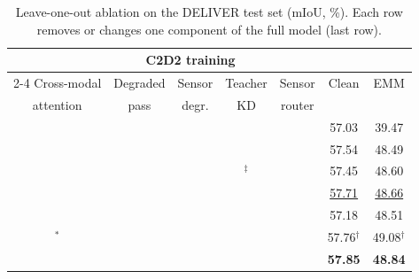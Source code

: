 \documentclass[10pt]{article}
\newcommand{\best}[1]{\textbf{#1}}
\newcommand{\second}[1]{\underline{#1}}
\newcommand{\cmark}{\ding{51}}
\newcommand{\xmark}{\textcolor[gray]{0.55}{\ding{55}}}
\newcommand{\tabsetup}{\footnotesize\setlength{\tabcolsep}{2.5pt}\renewcommand{\arraystretch}{1.1}}
\begin{document}
\begin{table}[!htbp]
\caption{Leave-one-out ablation on the DELIVER test set (mIoU, \%). Each row removes or changes one component of the full model (last row).}
\label{tab:ablation_loo}
\centering\tabsetup
\begin{tabular*}{\columnwidth}{@{\extracolsep{\fill}}ccccccc@{}}
\toprule
 & \multicolumn{3}{c}{C2D2 training} & & & \\
\cmidrule(lr){2-4}
Cross-modal & Degraded & Sensor & Teacher & Sensor & Clean & EMM \\
attention & pass & degr. & KD & router & & \\
\midrule
\cmark & \xmark & \xmark & \cmark & \cmark & 57.03 & 39.47 \\
\cmark & \cmark & \cmark & \xmark & \cmark & 57.54 & 48.49 \\
\cmark & \cmark & \cmark & \cmark$^{\ddagger}$ & \cmark & 57.45 & 48.60 \\
\cmark & \cmark & \xmark & \cmark & \cmark & \second{57.71} & \second{48.66} \\
\cmark & \cmark & \cmark & \cmark & \xmark & 57.18 & 48.51 \\
\xmark$^{*}$ & \cmark & \cmark & \cmark & \cmark & 57.76$^{\dagger}$ & 49.08$^{\dagger}$ \\
\cmark & \cmark & \cmark & \cmark & \cmark & \best{57.85} & \best{48.84} \\
\bottomrule
\end{tabular*}

\end{table}
\end{document}
